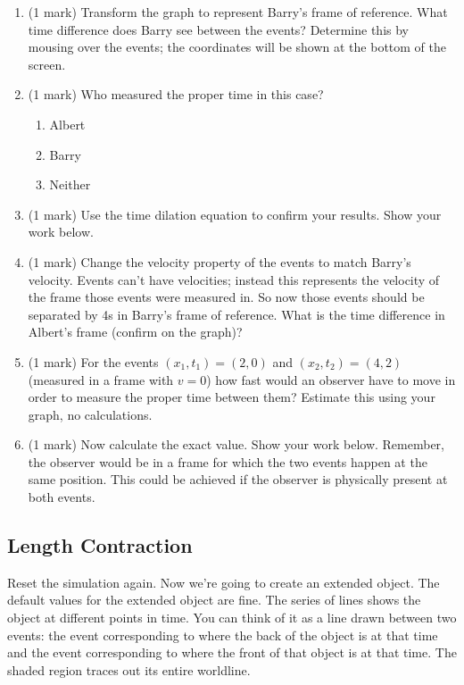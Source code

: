 \documentclass{article}
\begin{document}
\begin{enumerate}
\item (1 mark) Transform the graph to represent Barry's frame of reference. What time difference does Barry see between the events? Determine this by mousing over the events; the coordinates will be shown at the bottom of the screen.
\vspace{2cm}
\item (1 mark) Who measured the proper time in this case?
\begin{enumerate}
\item Albert
\item Barry
\item Neither
\end{enumerate}
\item (1 mark) Use the time dilation equation to confirm your results. Show your work below.
\vspace{4cm}
\item (1 mark) Change the velocity property of the events to match Barry's velocity. Events can't have velocities; instead this represents the velocity of the frame those events were measured in. So now those events should be separated by 4s in Barry's frame of reference. What is the time difference in Albert's frame (confirm on the graph)?
\vspace{2cm}
\clearpage
\item (1 mark) For the events $(x_1,t_1)=(2,0)$ and $(x_2,t_2)=(4,2)$ (measured in a frame with $v=0$) how fast would an observer have to move in order to measure the proper time between them? Estimate this using your graph, no calculations.
\vspace{2cm}
\item (1 mark) Now calculate the exact value. Show your work below. Remember, the observer would be in a frame for which the two events happen at the same position. This could be achieved if the observer is physically present at both events.
\vspace{4cm}
\end{enumerate}

\subsection*{Length Contraction}

Reset the simulation again. Now we're going to create an extended object. The default values for the extended object are fine. The series of lines shows the object at different points in time. You can think of it as a line drawn between two events: the event corresponding to where the back of the object is at that time and the event corresponding to where the front of that object is at that time. The shaded region traces out its entire worldline.
\end{document}
